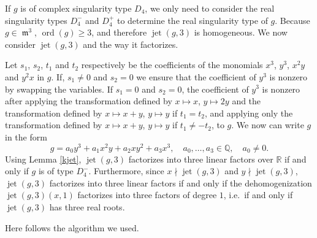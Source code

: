 \documentclass{amsproc}
\DeclareMathOperator{\ord}{ord}
\DeclareMathOperator{\m}{\mathfrak{m}}
\DeclareMathOperator{\jt}{jet}
\begin{document}
If $g$ is of complex singularity type $D_4$, we only need
to consider the real singularity types $D_4^-$ and $D_4^+$ to determine the
real singularity type of $g$. Because $g\in \m^3$, $\ord(g)\ge3$,
and therefore $\jt(g,3)$ is homogeneous. We now consider
$\jt(g,3)$ and the way it factorizes.

Let $s_1$, $s_2$, $t_1$ and $t_2$  respectively be the coefficients of the monomials $x^3$, $y^3$, $x^2y$ and $y^2x$ in $g$. If, $s_1\neq 0$ and $s_2=0$ we ensure that the coefficient of $y^3$ is
nonzero by swapping the variables. If $s_1=0$ and $s_2=0$, the coefficient
of $y^3$ is nonzero after applying the transformation defined by $x\mapsto x$, $y\mapsto 2y$ and the transformation defined by $x\mapsto
x+y$, $y\mapsto y$ if $t_1=t_2$, and applying only the transformation defined by $x\mapsto x+y$, $y\mapsto
y$ if $t_1\neq -t_2$, to $g$. We now can write $g$ in the form
\begin{equation*}
g=a_0y^3+a_1x^2y+a_2xy^2+a_3x^3,\quad a_0,\ldots,a_3\in\mathbb Q,\quad a_0\neq 0.
\end{equation*}
Using Lemma \ref{kjet}, $\jt(g,3)$ factorizes into three linear factors over
$\mathbb R$ if and only if $g$ is of type $D_4^-$. Furthermore, since
$x\nmid
\jt(g,3)$ and $y\nmid \jt(g,3)$, $\jt(g,3)$ factorizes into three linear factors if and only if
the dehomogenization $\jt(g,3)(x,1)$ factorizes into three factors of degree $1$, i.e.~if and only if $\jt(g,3)$ has three real roots.

Here follows the algorithm we used.
\end{document}
